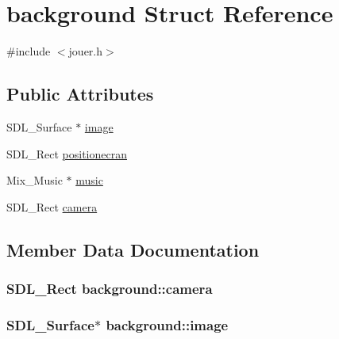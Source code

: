 \hypertarget{structbackground}{}\section{background Struct Reference}
\label{structbackground}


{\ttfamily \#include $<$jouer.\+h$>$}

\subsection*{Public Attributes}
\begin{DoxyCompactItemize}
\item 
S\+D\+L\+\_\+\+Surface $\ast$ \hyperlink{structbackground_a321e7102a3c80e33d40a276f09b8e3f6}{image}
\item 
S\+D\+L\+\_\+\+Rect \hyperlink{structbackground_ad439c2936039aabe3bdc580b6d6f66f0}{positionecran}
\item 
Mix\+\_\+\+Music $\ast$ \hyperlink{structbackground_a8f0644304ef942f20fae345fd7782af3}{music}
\item 
S\+D\+L\+\_\+\+Rect \hyperlink{structbackground_a71bbbffa05a377b142caee07ffa54833}{camera}
\end{DoxyCompactItemize}


\subsection{Member Data Documentation}
\subsubsection[{\texorpdfstring{camera}{camera}}]{\setlength{\rightskip}{0pt plus 5cm}S\+D\+L\+\_\+\+Rect background\+::camera}\hypertarget{structbackground_a71bbbffa05a377b142caee07ffa54833}{}\label{structbackground_a71bbbffa05a377b142caee07ffa54833}
\subsubsection[{\texorpdfstring{image}{image}}]{\setlength{\rightskip}{0pt plus 5cm}S\+D\+L\+\_\+\+Surface$\ast$ background\+::image}\hypertarget{structbackground_a321e7102a3c80e33d40a276f09b8e3f6}{}\label{structbackground_a321e7102a3c80e33d40a276f09b8e3f6}
